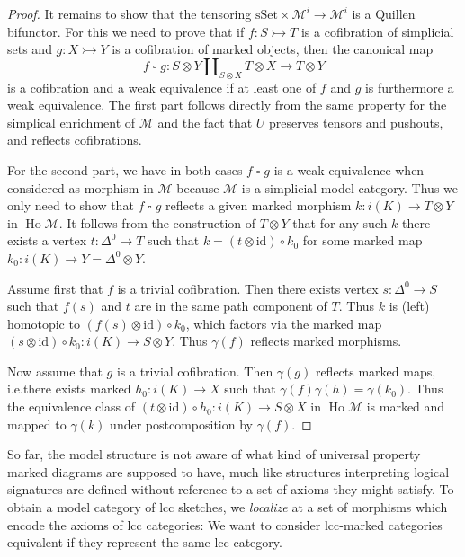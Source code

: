 \documentclass{article}
\theoremstyle{remark}
\theoremstyle{definition}
\begin{document}
\begin{proof}
  It remains to show that the tensoring $\mathrm{sSet} \times \mathcal{M}^i \rightarrow \mathcal{M}^i$ is a Quillen bifunctor.
  For this we need to prove that if $f : S \rightarrowtail T$ is a cofibration of simplicial sets and $g : X \rightarrowtail Y$ is a cofibration of marked objects, then the canonical map
  \begin{equation}
    f \mathbin{\square} g : S \otimes Y \amalg_{S \otimes X} T \otimes X \rightarrow T \otimes Y
  \end{equation}
  is a cofibration and a weak equivalence if at least one of $f$ and $g$ is furthermore a weak equivalence.
  The first part follows directly from the same property for the simplical enrichment of $\mathcal{M}$ and the fact that $U$ preserves tensors and pushouts, and reflects cofibrations.

  For the second part, we have in both cases $f \mathbin{\square} g$ is a weak equivalence when considered as morphism in $\mathcal{M}$ because $\mathcal{M}$ is a simplicial model category.
  Thus we only need to show that $f \mathbin{\square} g$ reflects a given marked morphism $k : i(K) \rightarrow T \otimes Y$ in $\operatorname{Ho} \mathcal{M}$.
  It follows from the construction of $T \otimes Y$ that for any such $k$ there exists a vertex $t : \Delta^0 \rightarrow T$ such that $k = (t \otimes \mathrm{id}) \circ k_0$ for some marked map $k_0 : i(K) \rightarrow Y = \Delta^0 \otimes Y$.

  Assume first that $f$ is a trivial cofibration.
  Then there exists vertex $s : \Delta^0 \rightarrow S$ such that $f(s)$ and $t$ are in the same path component of $T$.
  Thus $k$ is (left) homotopic to $(f(s) \otimes \mathrm{id}) \circ k_0$, which factors via the marked map $(s \otimes \mathrm{id}) \circ k_0 : i(K) \rightarrow S \otimes Y$.
  Thus $\gamma(f)$ reflects marked morphisms.

  Now assume that $g$ is a trivial cofibration.
  Then $\gamma(g)$ reflects marked maps, i.e.\@ there exists marked $h_0 : i(K) \rightarrow X$ such that $\gamma(f)\gamma(h) = \gamma(k_0)$.
  Thus the equivalence class of $(t \otimes \mathrm{id}) \circ h_0 : i(K) \rightarrow S \otimes X$ in $\operatorname{Ho} \mathcal{M}$ is marked and mapped to $\gamma(k)$ under postcomposition by $\gamma(f)$.
\end{proof}

So far, the model structure is not aware of what kind of universal property marked diagrams are supposed to have, much like structures interpreting logical signatures are defined without reference to a set of axioms they might satisfy.
To obtain a model category of lcc sketches, we \emph{localize} at a set of morphisms which encode the axioms of lcc categories:
We want to consider lcc-marked categories equivalent if they represent the same lcc category.
\end{document}

